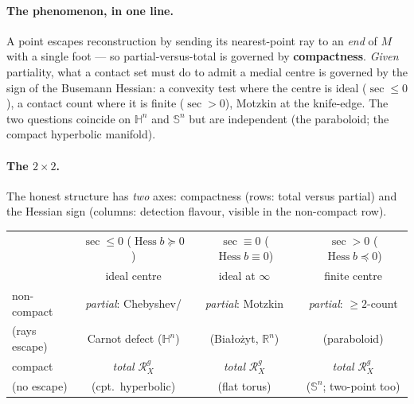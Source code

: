 \documentclass[11pt]{article}
\theoremstyle{remark}
\newcommand{\R}{\mathbb{R}}
\newcommand{\X}{X}
\newcommand{\Rx}{\mathcal{R}_{\X}}
\newcommand{\sect}{\operatorname{sec}}
\newcommand{\Hess}{\operatorname{Hess}}
\newcommand{\HH}{\mathbb{H}}
\newcommand{\Sn}{\mathbb{S}^{n}}
\begin{document}
\paragraph{The phenomenon, in one line.} A point escapes reconstruction by
sending its nearest-point ray to an \emph{end} of $M$ with a single foot
--- so partial-versus-total is governed by \textbf{compactness}.
\emph{Given} partiality, what a contact set must do to admit a medial
centre is governed by the sign of the Busemann Hessian: a convexity test
where the centre is ideal ($\sect\le0$), a contact count where it is finite
($\sect>0$), Motzkin at the knife-edge. The two questions coincide on
$\HH^{n}$ and $\Sn$ but are independent (the paraboloid; the compact
hyperbolic manifold).

\paragraph{The $2\times2$.} The honest structure has \emph{two} axes:
compactness (rows: total versus partial) and the Hessian sign (columns:
detection flavour, visible in the non-compact row).

\begin{center}
\begin{tabular}{l|ccc}
\toprule
 & $\sect\le0$ ($\Hess b\succeq0$) & $\sect\equiv0$ ($\Hess b\equiv0$)
   & $\sect>0$ ($\Hess b\preceq0$)\\
 & ideal centre & ideal at $\infty$ & finite centre\\
\midrule
non-compact & \emph{partial}: Chebyshev/ & \emph{partial}: Motzkin
   & \emph{partial}: $\ge2$-count\\
(rays escape) & Carnot defect ($\HH^{n}$) & (Bia\l{}o\.zyt, $\R^{n}$)
   & (paraboloid)\\
\midrule
compact & \emph{total} $\Rx^{g}$ & \emph{total} $\Rx^{g}$
   & \emph{total} $\Rx^{g}$\\
(no escape) & (cpt.\ hyperbolic) & (flat torus)
   & ($\Sn$; two-point too)\\
\bottomrule
\end{tabular}
\end{center}
\end{document}
